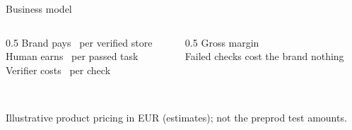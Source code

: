 \begin{frame}{Business model}
  \centering
  \begin{columns}[T]
    \begin{column}{0.5\textwidth}
      \alert{Brand pays} \PricePerStore\ per verified store\\[0.5em]
      \alert{Human earns} \PayoutPerTask\ per passed task\\[0.5em]
      \alert{Verifier costs} \VerifierFee\ per check
    \end{column}
    \begin{column}{0.5\textwidth}
      \alert{Gross margin} \GrossMargin\\[0.5em]
      \alert{Failed checks cost the brand} nothing
    \end{column}
  \end{columns}
  \vspace{1em}{\small €12 pay-as-you-go \,\textbullet\, €399/month for 50 checks \,\textbullet\, €5--6 at volume}\\[0.4em]{\scriptsize Illustrative product pricing in EUR (estimates); not the preprod test amounts.}
\end{frame}
